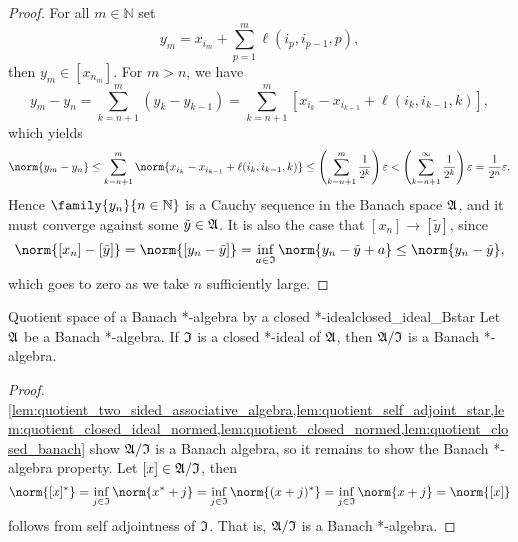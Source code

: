 \begin{proof}
    For all \(m \in \mathbb{N}\) set
    \begin{equation*}
        y_m = x_{i_m} + \sum_{p = 1}^m \ell(i_p, i_{p-1}, p),
    \end{equation*}
    then \(y_m \in [x_{n_m}]\). For \(m > n\), we have
    \begin{equation*}
        y_m - y_n = \sum_{k = n+1}^m (y_k - y_{k-1}) = \sum_{k=n+1}^m \left[x_{i_k} - x_{i_{k-1}} + \ell(i_k, i_{k-1},k)\right],
    \end{equation*}
    which yields
    \begin{equation*}
        \norm{y_m - y_n} \leq \sum_{k=n+1}^m \norm{x_{i_k} - x_{i_{k-1}} + \ell(i_k, i_{k-1},k)} \leq \left(\sum_{k=n+1}^m \frac{1}{2^k}\right) \varepsilon< \left(\sum_{k=n+1}^\infty \frac{1}{2^k}\right) \varepsilon = \frac{1}{2^n}\varepsilon.
    \end{equation*}
    Hence \(\family{y_n}{n \in \mathbb{N}}\) is a Cauchy sequence in the Banach space \(\mathfrak{A}\), and it must converge against some \(\tilde{y} \in \mathfrak{A}\). It is also the case that \([x_n] \to [\tilde{y}]\), since
    \begin{equation*}
        \norm{[x_n] - [\tilde{y}]} = \norm{[y_n - \tilde{y}]} = \inf_{a\in \algebra{I}}{\norm{y_n - \tilde{y} + a}} \leq \norm{y_n - \tilde{y}},
    \end{equation*}
    which goes to zero as we take \(n\) sufficiently large.
\end{proof}

\begin{theorem}{Quotient space of a Banach *-algebra by a closed *-ideal}{closed_ideal_Bstar}
    Let \(\mathfrak{A}\) be a Banach *-algebra. If \(\mathfrak{I}\) is a  closed *-ideal of \(\mathfrak{A}\), then \(\mathfrak{A}/\mathfrak{I}\) is a Banach *-algebra.
\end{theorem}
\begin{proof}
    \cref{lem:quotient_two_sided_associative_algebra,lem:quotient_self_adjoint_star,lem:quotient_closed_ideal_normed,lem:quotient_closed_normed,lem:quotient_closed_banach} show \(\mathfrak{A}/\mathfrak{I}\) is a Banach algebra, so it remains to show the Banach *-algebra property. Let \([x] \in \mathfrak{A}/\mathfrak{I}\), then
    \begin{equation*}
        \norm{[x]^*} = \inf_{j\in\algebra{I}}{\norm{x^* + j}}=\inf_{j\in\algebra{I}}{\norm{(x + j)^*}} = \inf_{j\in\algebra{I}}{\norm{x+j}} = \norm{[x]}
    \end{equation*}
    follows from self adjointness of \(\mathfrak{I}\). That is, \(\mathfrak{A}/\mathfrak{I}\) is a Banach *-algebra.
\end{proof}
